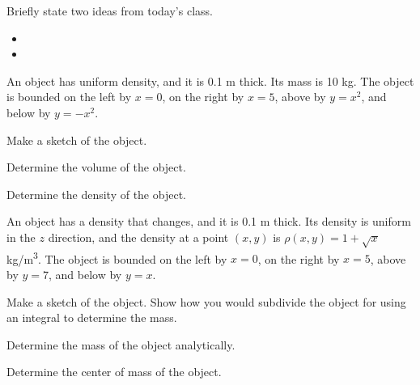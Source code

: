 \begin{problem}
\item Briefly state two ideas from today's class.
  \begin{itemize}
  \item 
  \item 
  \end{itemize}
\item An object has uniform density, and it is 0.1 m thick. Its mass
  is 10 kg. The object is bounded on the left by $x=0$, on the right
  by $x=5$, above by $y=x^2$, and below by $y=-x^2$.
  \begin{subproblem}
    \item Make a sketch of the object. 
      \vfill
    \item Determine the volume of the object.
      \vfill
    \item Determine the density of the object.
      \vfill
  \end{subproblem}
  \clearpage

\item An object has a density that changes, and it is 0.1 m thick. Its
  density is uniform in the $z$ direction, and the density at a point
  $(x,y)$ is $\rho(x,y)=1+\sqrt{x}$ kg/m\textsuperscript{3}. The
  object is bounded on the left by $x=0$, on the right by $x=5$, above
  by $y=7$, and below by $y=x$.
  \begin{subproblem}
    \item Make a sketch of the object. Show how you would subdivide
      the object for using an integral to determine the mass.
      \vfill
    \item Determine the mass of the object analytically.
      \vfill
    \item Determine the center of mass of the object.
      \vfill
  \end{subproblem}
\end{problem}


